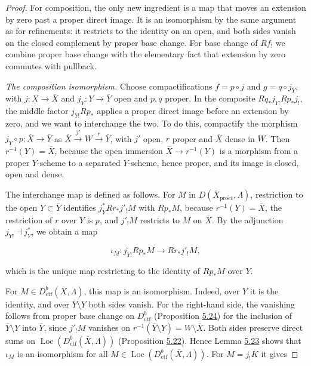 \documentclass[11pt]{article}
\providecommand{\Loc}{}\renewcommand{\Loc}{\operatorname{Loc}}
\begin{document}
\begin{proof}[{Proof}]\label{bp91}%
For composition, the only new ingredient is a map that moves an extension by zero past a proper direct image. It is an isomorphism by the same argument as for refinements: it restricts to the identity on an open, and both sides vanish on the closed complement by proper base change. For base change of \(Rf_!\) we combine proper base change with the elementary fact that extension by zero commutes with pullback.

\emph{The composition isomorphism.} Choose compactifications \(f=p\circ j\) and \(g=q\circ j_Y\), with \(j:X\to\overline X\) and \(j_Y:Y\to\overline Y\) open and \(p,q\) proper. In the composite \(Rq_*j_{Y!}Rp_*j_!\), the middle factor \(j_{Y!}Rp_*\) applies a proper direct image before an extension by zero, and we want to interchange the two. To do this, compactify the morphism \(j_Y\circ p:\overline X\to\overline Y\) as \(\overline X\xrightarrow{j'}W\xrightarrow{r}\overline Y\), with \(j'\) open, \(r\) proper and \(\overline X\) dense in \(W\). Then \(r^{-1}(Y)=\overline X\), because the open immersion \(\overline X\to r^{-1}(Y)\) is a morphism from a proper \(Y\)-scheme to a separated \(Y\)-scheme, hence proper, and its image is closed, open and dense.

The interchange map is defined as follows. For \(M\) in \(D(\overline X_{\mathrm{pro}\acute{e}t},\Lambda)\), restriction to the open \(Y\subset\overline Y\) identifies \(j_Y^*Rr_*j'_!M\) with \(Rp_*M\), because \(r^{-1}(Y)=\overline X\), the restriction of \(r\) over \(Y\) is \(p\), and \(j'_!M\) restricts to \(M\) on \(\overline X\). By the adjunction \(j_{Y!}\dashv j_Y^*\), we obtain a map

\[
\iota_M:j_{Y!}Rp_*M\longrightarrow Rr_*j'_!M,
\tag{5.9}
\]

which is the unique map restricting to the identity of \(Rp_*M\) over \(Y\).

For \(M\in D^b_{\mathrm{ctf}}(\overline X,\Lambda)\), this map is an isomorphism. Indeed, over \(Y\) it is the identity, and over \(\overline Y\setminus Y\) both sides vanish. For the right-hand side, the vanishing follows from proper base change on \(D^b_{\mathrm{ctf}}\) (Proposition \hyperref[bp82]{5.24}) for the inclusion of \(\overline Y\setminus Y\) into \(\overline Y\), since \(j'_!M\) vanishes on \(r^{-1}(\overline Y\setminus Y)=W\setminus\overline X\). Both sides preserve direct sums on \(\Loc(D^b_{\mathrm{ctf}}(\overline X,\Lambda))\) (Proposition \hyperref[bp76]{5.22}). Hence Lemma \hyperref[bp79]{5.23} shows that \(\iota_M\) is an isomorphism for all \(M\in\Loc(D^b_{\mathrm{ctf}}(\overline X,\Lambda))\). For \(M=j_!K\) it gives


\end{proof}
\end{document}
